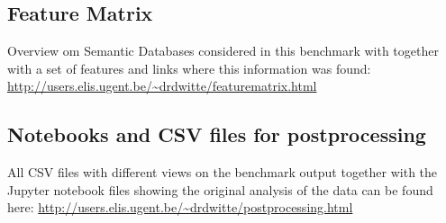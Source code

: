 \documentclass[twocolumn]{bmcart}%
\begin{document}
\begin{backmatter}
  \subsection*{Feature Matrix}
  Overview om Semantic Databases considered in this benchmark with together with a set of
  features and links where this information was found:   \url{http://users.elis.ugent.be/~drdwitte/featurematrix.html}
  \subsection*{Notebooks and CSV files for postprocessing}
  All CSV files with different views on the benchmark output together with the Jupyter notebook files showing the original analysis of the data can be found here: \url{http://users.elis.ugent.be/~drdwitte/postprocessing.html}
\end{backmatter}
\end{document}
